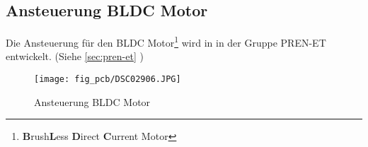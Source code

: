 \subsection{Ansteuerung BLDC Motor}
\label{sec:bldc}
Die Ansteuerung für den BLDC Motor\footnote{\textbf{B}rush\textbf{L}ess 
\textbf{D}irect \textbf{C}urrent Motor} wird in in der Gruppe PREN-ET 
entwickelt. (Siehe \ref{sec:pren-et} )
\begin{figure}[h!]
    \centering
    \texttt{[image: fig\_pcb/DSC02906.JPG]}
    \caption{Ansteuerung BLDC Motor}
    \label{fig:dc}
\end{figure}
